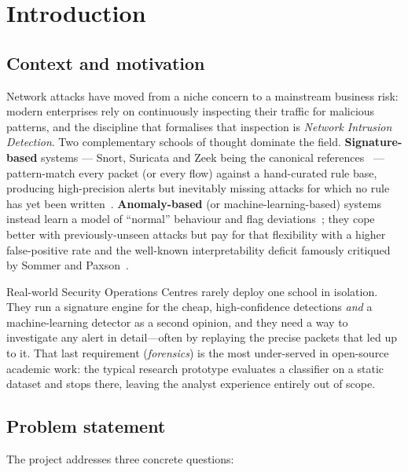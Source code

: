 \section{Introduction}
\label{sec:introduction}

\subsection{Context and motivation}

Network attacks have moved from a niche concern to a mainstream business
risk: modern enterprises rely on continuously inspecting their traffic for
malicious patterns, and the discipline that formalises that inspection is
\textit{Network Intrusion Detection}. Two complementary schools of thought
dominate the field. \textbf{Signature-based} systems --- Snort,
Suricata and Zeek being the canonical references~\cite{roesch1999snort,
suricata, paxson1999bro} --- pattern-match every packet (or every flow)
against a hand-curated rule base, producing high-precision alerts but
inevitably missing attacks for which no rule has yet been
written~\cite{garcia2009anomaly}. \textbf{Anomaly-based} (or
machine-learning-based) systems instead learn a model of ``normal''
behaviour and flag deviations~\cite{buczak2016survey}; they cope better
with previously-unseen attacks but pay for that flexibility with a higher
false-positive rate and the well-known interpretability deficit famously
critiqued by Sommer and Paxson~\cite{sommer2010outside}.

Real-world Security Operations Centres rarely deploy one school in
isolation. They run a signature engine for the cheap, high-confidence
detections \textit{and} a machine-learning detector as a second opinion,
and they need a way to investigate any alert in detail---often by
replaying the precise packets that led up to it. That last requirement
(\textit{forensics}) is the most under-served in open-source academic
work: the typical research prototype evaluates a classifier on a static
dataset and stops there, leaving the analyst experience entirely out of
scope.

\subsection{Problem statement}

The project addresses three concrete questions:


